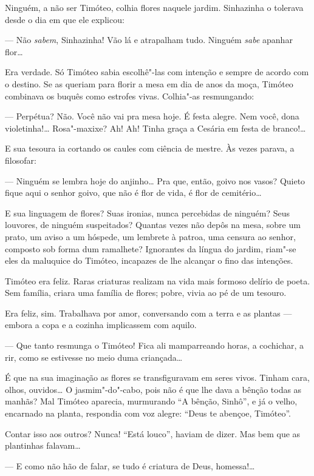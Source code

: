 Ninguém, a não ser Timóteo, colhia flores naquele jardim. Sinhazinha o
tolerava desde o dia em que ele explicou:

--- Não \emph{sabem}, Sinhazinha! Vão lá e atrapalham tudo. Ninguém
\emph{sabe} apanhar flor\ldots{}

Era verdade. Só Timóteo sabia escolhê"-las com intenção e sempre de
acordo com o destino. Se as queriam para florir a mesa em dia de anos da
moça, Timóteo combinava os buquês como estrofes vivas. Colhia"-as
resmungando:

--- Perpétua? Não. Você não vai pra mesa hoje. É festa alegre. Nem você,
dona violetinha!\ldots{} Rosa"-maxixe? Ah! Ah! Tinha graça a Cesária em festa
de branco!\ldots{}

E sua tesoura ia cortando os caules com ciência de mestre. Às vezes
parava, a filosofar:

--- Ninguém se lembra hoje do anjinho\ldots{} Pra que, então, goivo nos
vasos? Quieto fique aqui o senhor goivo, que não é flor de vida, é flor
de cemitério\ldots{}

E sua linguagem de flores? Suas ironias, nunca percebidas de ninguém?
Seus louvores, de ninguém suspeitados? Quantas vezes não depôs na mesa,
sobre um prato, um aviso a um hóspede, um lembrete à patroa, uma censura
ao senhor, composto sob forma dum ramalhete? Ignorantes da língua do
jardim, riam"-se eles da maluquice do Timóteo, incapazes de lhe alcançar
o fino das intenções.

Timóteo era feliz. Raras criaturas realizam na vida mais formoso delírio
de poeta. Sem família, criara uma família de flores; pobre, vivia ao pé
de um tesouro.

Era feliz, sim. Trabalhava por amor, conversando com a terra e as
plantas --- embora a copa e a cozinha implicassem com aquilo.

--- Que tanto resmunga o Timóteo! Fica ali mamparreando horas, a
cochichar, a rir, como se estivesse no meio duma criançada\ldots{}

É que na sua imaginação as flores se transfiguravam em seres vivos.
Tinham cara, olhos, ouvidos\ldots{} O jasmim"-do"-cabo, pois não é que lhe dava
a bênção todas as manhãs? Mal Timóteo aparecia, murmurando ``A bênção,
Sinhô'', e já o velho, encarnado na planta, respondia com voz alegre:
``Deus te abençoe, Timóteo''.

Contar isso aos outros? Nunca! ``Está louco'', haviam de dizer. Mas bem
que as plantinhas falavam\ldots{}

--- E como não hão de falar, se tudo é criatura de Deus, homessa!\ldots{}

